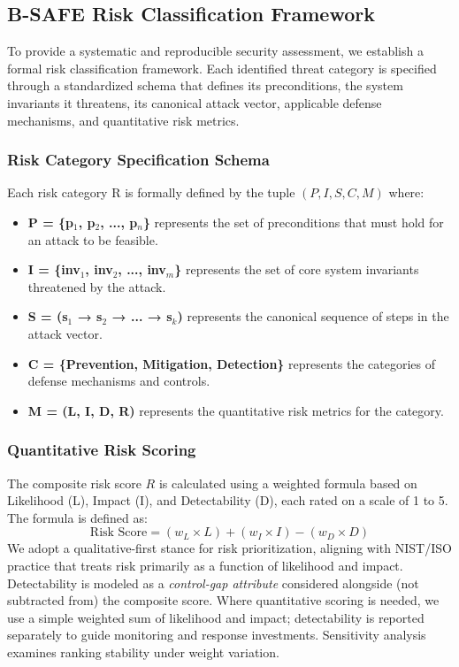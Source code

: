 \subsection{B-SAFE Risk Classification Framework}
\label{sec:methodology_risk_framework}
To provide a systematic and reproducible security assessment, we establish a formal risk classification framework. Each identified threat category is specified through a standardized schema that defines its preconditions, the system invariants it threatens, its canonical attack vector, applicable defense mechanisms, and quantitative risk metrics.

\subsubsection{Risk Category Specification Schema}
Each risk category R is formally defined by the tuple \( (P, I, S, C, M) \) where:
\begin{itemize}
    \item \textbf{P = \{p$_1$, p$_2$, ..., p$_n$\}} represents the set of preconditions that must hold for an attack to be feasible.
    \item \textbf{I = \{inv$_1$, inv$_2$, ..., inv$_m$\}} represents the set of core system invariants threatened by the attack.
    \item \textbf{S = (s$_1$ → s$_2$ → ... → s$_k$)} represents the canonical sequence of steps in the attack vector.
    \item \textbf{C = \{Prevention, Mitigation, Detection\}} represents the categories of defense mechanisms and controls.
    \item \textbf{M = (L, I, D, R)} represents the quantitative risk metrics for the category.
\end{itemize}

\subsubsection{Quantitative Risk Scoring}
The composite risk score \( R \) is calculated using a weighted formula based on Likelihood (L), Impact (I), and Detectability (D), each rated on a scale of 1 to 5. The formula is defined as:
\begin{equation}
    \text{Risk Score} = (w_L \times L) + (w_I \times I) - (w_D \times D)
\end{equation}
We adopt a qualitative-first stance for risk prioritization, aligning with NIST/ISO practice that treats risk primarily as a function of likelihood and impact. Detectability is modeled as a \textit{control-gap attribute} considered alongside (not subtracted from) the composite score. Where quantitative scoring is needed, we use a simple weighted sum of likelihood and impact; detectability is reported separately to guide monitoring and response investments. Sensitivity analysis examines ranking stability under weight variation.

